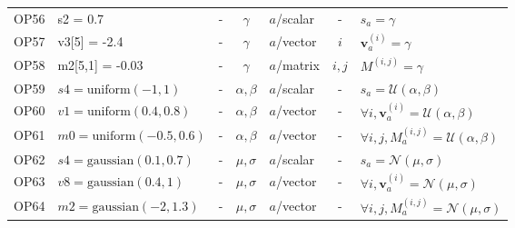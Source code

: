 \documentclass[11pt,oneside,openany,report]{jsbook}
\begin{document}
\begin{center}
{{\begin{longtable}{l|l|lc|lc|l}
        OP56 & s2 = 0.7                                   & -                       & $ \gamma $      & $a$/scalar & -     & $s_a = \gamma $                                                                \\
        OP57 & v3[5] = -2.4                               & -                       & $\gamma$        & $a$/vector & $i$   & $\bm{v}_a^{(i)} = \gamma $                                                     \\
        OP58 & m2[5,1] = -0.03                            & -                       & $\gamma$        & $a$/matrix & $i,j$ & $M^{(i,j)}= \gamma$                                                            \\
        OP59 & $s4 = \mathrm{uniform}(-1,1)$              & -                       & $\alpha, \beta$ & $a$/scalar & -     & $s_a = \mathcal{U}(\alpha, \beta)$                                             \\
        OP60 & $v1 = \mathrm{uniform}(0.4,0.8)$           & -                       & $\alpha, \beta$ & $a$/vector & -     & $\forall i, \bm{v}_a^{(i)} = \mathcal{U}(\alpha, \beta)$                       \\
        OP61 & $m0 = \mathrm{uniform}(-0.5,0.6)$          & -                       & $\alpha, \beta$ & $a$/vector & -     & $\forall i, j, M_a^{(i, j)} = \mathcal{U}(\alpha, \beta)$                      \\
        OP62 & $s4 = \mathrm{gaussian}(0.1,0.7)$          & -                       & $\mu, \sigma$   & $a$/scalar & -     & $s_a = \mathcal{N}(\mu, \sigma)$                                               \\
        OP63 & $v8 = \mathrm{gaussian}(0.4,1)$            & -                       & $\mu, \sigma$   & $a$/vector & -     & $\forall i, \bm{v}_a^{(i)} = \mathcal{N}(\mu, \sigma)$                         \\
        OP64 & $m2 = \mathrm{gaussian}(-2,1.3)$           & -                       & $\mu, \sigma$   & $a$/vector & -     & $\forall i, j, M_a^{(i, j)} = \mathcal{N}(\mu, \sigma)$                        \\
        \hline
      \end{longtable}}}

\end{center}



\end{document}
